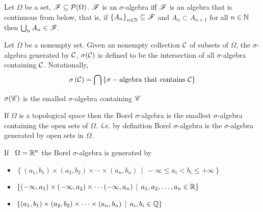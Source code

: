 \begin{fact}
    Let $\Omega$ be a set, ${\mathscr F} \subseteq {\cal P} (\Omega )$. ${\mathscr F}$ is an $\sigma$-algebra iff ${\mathscr F}$ is an algebra that is continuous from below, that is, if $\left\{ A_n \right\}_{n\in \mathbb N} \subseteq {\mathscr F}$ and $A_n \subset A_{n+1}$ for all $n\in \mathbb N$ then $\bigcup _n A_n \in {\mathscr F}$.
\end{fact}

\begin{definition}
    Let $\Omega$ be a nonempty set. Given an nonempty collection ${\cal C}$ of subsets of $\Omega$, the $\sigma$-algebra generated by ${\cal C}$, $\sigma ({\cal C})$ is defined to be the intersection of all $\sigma$-algebra containing ${\cal C}$. Notationally,
    $$\sigma \left( {\cal C} \right) = \bigcap \left\{ \sigma-\text{algebra that contains  }{\cal C} \right\}$$
    \label{def:generated-sigma-algebra}
\end{definition}

$\sigma({\mathscr C})$ is the smalled $\sigma$-algebra containing ${\mathscr C}$

\begin{definition}
    If $\Omega$ is a topological space then the Borel $\sigma$-algebra is the smallest $\sigma$-algebra containing the open sets of $\Omega$. $\textit{i}.\textit{e}.$ by definition Borel $\sigma$-algebra is the $\sigma$-algebra generated by open sets in $\Omega$.
    \label{def:borel-sigma-algebra}
\end{definition}


\begin{fact}
    If \ $\Omega = \mathbb R ^n$ the Borel $\sigma$-algebra is generated by
    \begin{itemize}
	\item $\left\{ \left( a_1 , b_1 \right) \times \left( a_2 , b_2 \right) \times\cdots \times \left( a_n , b_n \right) \, \mid \, -\infty \le a_i < b_i \le +\infty  \right\} $
	\item $\left\{ \left( -\infty , a_1 \right) \times \left( -\infty , a_2 \right) \times \cdots \left( -\infty , a_n \right) \, \mid \, a_1 ,a_2, \ldots , a_n \in \mathbb R \right\}$
	\item $\left\{ \left( a_1 , b_1 \right)\times \left( a_2 , b_2 \right) \times \cdots \times \left( a_n , b_n \right) \, \mid \, a_i , b_i \in \mathbb Q \right\}$
    \end{itemize}
\end{fact}

